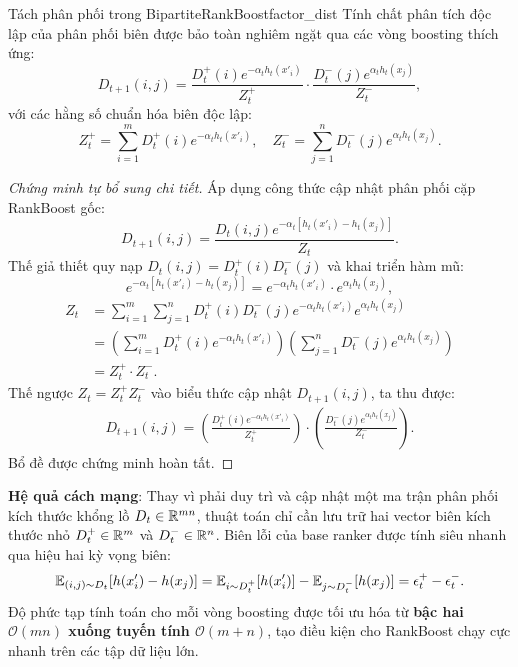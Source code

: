 \begin{lemma}{Tách phân phối trong BipartiteRankBoost}{factor_dist}
Tính chất phân tích độc lập của phân phối biên được bảo toàn nghiêm ngặt qua các vòng boosting thích ứng:
\begin{equation}
    D_{t+1}(i, j) = \frac{D^+_t(i) e^{-\alpha_t h_t(x'_i)}}{Z^+_t} \cdot \frac{D^-_t(j) e^{\alpha_t h_t(x_j)}}{Z^-_t},
\end{equation}
với các hằng số chuẩn hóa biên độc lập:
\[
    Z^+_t = \sum_{i=1}^m D^+_t(i) e^{-\alpha_t h_t(x'_i)}, \quad
    Z^-_t = \sum_{j=1}^n D^-_t(j) e^{\alpha_t h_t(x_j)}.
\]
\end{lemma}

\begin{proof}[Chứng minh tự bổ sung chi tiết]
Áp dụng công thức cập nhật phân phối cặp RankBoost gốc:
\[
    D_{t+1}(i, j) = \frac{D_t(i, j) e^{-\alpha_t [h_t(x'_i) - h_t(x_j)]}}{Z_t}.
\]
Thế giả thiết quy nạp $D_t(i,j) = D^+_t(i) D^-_t(j)$ và khai triển hàm mũ:
\[
    e^{-\alpha_t[h_t(x'_i) - h_t(x_j)]} = e^{-\alpha_t h_t(x'_i)} \cdot e^{\alpha_t h_t(x_j)},
\]
\begin{align*}
    Z_t &= \sum_{i=1}^m \sum_{j=1}^n D^+_t(i) D^-_t(j) e^{-\alpha_t h_t(x'_i)} e^{\alpha_t h_t(x_j)} \\
    &= \left( \sum_{i=1}^m D^+_t(i) e^{-\alpha_t h_t(x'_i)} \right) \left( \sum_{j=1}^n D^-_t(j) e^{\alpha_t h_t(x_j)} \right) \\
    &= Z^+_t \cdot Z^-_t.
\end{align*}
Thế ngược $Z_t = Z^+_t Z^-_t$ vào biểu thức cập nhật $D_{t+1}(i,j)$, ta thu được:
\begin{align*}
    D_{t+1}(i, j) = \left( \frac{D^+_t(i) e^{-\alpha_t h_t(x'_i)}}{Z^+_t} \right) \cdot \left( \frac{D^-_t(j) e^{\alpha_t h_t(x_j)}}{Z^-_t} \right).
\end{align*}
Bổ đề được chứng minh hoàn tất.
\end{proof}

\textbf{Hệ quả cách mạng}: Thay vì phải duy trì và cập nhật một ma trận phân phối kích thước khổng lồ $D_t \in \mathbb{R}^{mn}$, thuật toán chỉ cần lưu trữ hai vector biên kích thước nhỏ $D^+_t \in \mathbb{R}^m$ và $D^-_t \in \mathbb{R}^n$. Biên lỗi của base ranker được tính siêu nhanh qua hiệu hai kỳ vọng biên:
\begin{equation}
    \mathbb{E}_{(i,j) \sim D_t}[h(x'_i) - h(x_j)] = \mathbb{E}_{i \sim D^+_t}[h(x'_i)] - \mathbb{E}_{j \sim D^-_t}[h(x_j)] = \epsilon^+_t - \epsilon^-_t.
\end{equation}
Độ phức tạp tính toán cho mỗi vòng boosting được tối ưu hóa từ \textbf{bậc hai $\mathcal{O}(mn)$ xuống tuyến tính $\mathcal{O}(m+n)$}, tạo điều kiện cho RankBoost chạy cực nhanh trên các tập dữ liệu lớn.

